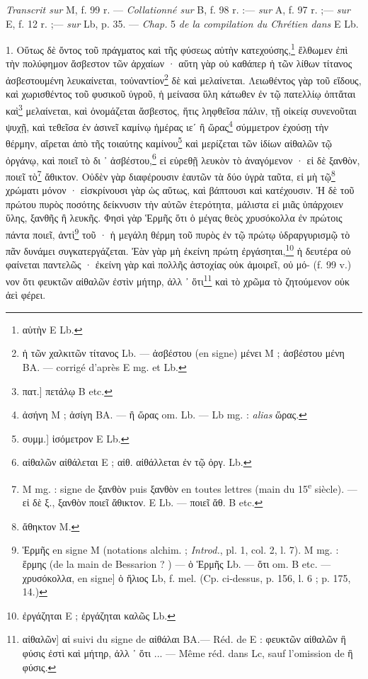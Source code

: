 \documentclass[a4paper, 11pt, oneside, polutonikogreek, french]{article}
\begin{document}
\emph{Transcrit sur} M, f. 99 r. --- \emph{Collationné sur} B, f. 98 r. :--- \emph{sur} A, f. 97 r. ;--- \emph{sur} E, f. 12 r. ;--- \emph{sur} Lb, p. 35. --- \emph{Chap.} 5 \emph{de la compilation du Chrétien dans} E Lb.

\bigskip

1. Οὕτως δὲ ὄντος τοῦ πράγματος καὶ τῆς φύσεως αὐτὴν κατεχούσης,\footnote{αὑτὴν E Lb.} ἔλθωμεν ἐπὶ τὴν πολύφημον ἄσβεστον τῶν ἀρχαίων · αὕτη γὰρ οὐ καθάπερ ἡ τῶν λίθων τίτανος ἀσβεστουμένη λευκαίνεται, τοὐναντίον\footnote{ἡ τῶν χαλκιτῶν τίτανος Lb. --- ἀσβέστου (en signe) μένει M ; ἀσβέστου μένη BA. --- corrigé d'après E mg. et Lb.} δὲ καὶ μελαίνεται. Λειωθέντος γὰρ τοῦ εἴδους, καὶ χωρισθέντος τοῦ φυσικοῦ ὑγροῦ, ἡ μείνασα ὕλη κάτωθεν ἐν τῷ πατελλίῳ ὀπτἄται καὶ\footnote{πατ.] πετάλῳ B etc.} μελαίνεται, καὶ ὀνομάζεται ἄσβεστος, ἥτις ληφθεῖσα πάλιν, τῇ οἰκείᾳ συνενοῦται ψυχῇ, καὶ τεθεῖσα ἐν ἀσινεῖ καμίνῳ ἡμέρας ιεʹ ἢ ὥρας\footnote{ἀσήνη M ; ἀσίγη BA. --- ἢ ὥρας om. Lb. --- Lb mg. : \emph{alias} ὥρας.} σύμμετρον ἐχούσῃ τὴν θέρμην, αἴρεται ἀπὸ τῆς τοιαύτης καμίνου\footnote{συμμ.] ἰσόμετρον E Lb.} καὶ μερίζεται τῶν ἰδίων αἰθαλῶν τῷ ὀργάνῳ, καὶ ποιεῖ τὸ δι ᾽ ἀσβέστου,\footnote{αἰθαλῶν αἰθάλεται E ; αἰθ. αἰθάλλεται ἐν τῷ ὀργ. Lb.} εἰ εὑρεθῇ λευκὸν τὸ ἀναγόμενον · εἰ δὲ ξανθὸν, ποιεῖ τὸ\footnote{M mg. : signe de ξανθὸν puis ξανθὸν en toutes lettres (main du 15\textsuperscript{e} siècle). --- εἰ δὲ ξ., ξανθὸν ποιεῖ ἄθικτον. E Lb. --- ποιεῖ ἄθ. B etc.} ἄθικτον. Οὐδὲν γὰρ διαφέρουσιν ἑαυτῶν τὰ δύο ὑγρὰ ταῦτα, εἰ μὴ τῷ\footnote{ἄθηκτον M.} χρώματι μόνον · εἰσκρίνουσι γὰρ ὡς αὕτως, καὶ βάπτουσι καὶ κατέχουσιν. Ἡ δὲ τοῦ πρώτου πυρὸς ποσότης δείκνυσιν τὴν αὐτῶν ἑτερότητα, μάλιστα εἰ μιᾶς ὑπάρχοιεν ὕλης, ξανθῆς ἢ λευκῆς. Φησὶ γὰρ Ἑρμῆς ὅτι ὁ μέγας θεὸς χρυσόκολλα ἐν πρώτοις πάντα ποιεῖ, ἀντὶ\footnote{Ἑρμῆς en signe M (notations alchim. ; \emph{Introd.}, pl. 1, col. 2, l. 7). M mg. : ἕρμης (de la main de Bessarion ? ) --- ὁ Ἑρμῆς Lb. --- ὅτι om. B etc. --- χρυσόκολλα, en signe] ὁ ἥλιος Lb, f. mel. (Cp. ci-dessus, p. 156, l. 6 ; p. 175, 14.)} τοῦ · ἡ μεγάλη θέρμη τοῦ πυρὸς ἐν τῷ πρώτῳ ὑδραργυρισμῷ τὸ πᾶν δυνάμει συγκατεργάζεται. Ἐὰν γὰρ μὴ ἐκείνη πρώτη ἐργάσηται,\footnote{ἐργάζηται E ; ἐργάζηται καλῶς Lb.} ἡ δευτέρα οὐ φαίνεται παντελῶς · ἐκείνη γὰρ καὶ πολλῆς ἀστοχίας οὐκ ἀμοιρεῖ, οὐ μό- (f. 99 v.) νον ὅτι φευκτῶν αἰθαλῶν ἐστὶν μήτηρ, ἀλλ ᾽ ὅτι\footnote{αἰθαλῶν] αἰ suivi du signe de αἰθάλαι BA.--- Réd. de E : φευκτῶν αἰθαλῶν ἣ φύσις ἐστὶ καὶ μήτηρ, ἀλλ ᾽ ὅτι ... --- Même réd. dans Lc, sauf l'omission de ἣ φύσις.} καὶ τὸ χρῶμα τὸ ζητούμενον οὐκ ἀεὶ φέρει.
\end{document}

